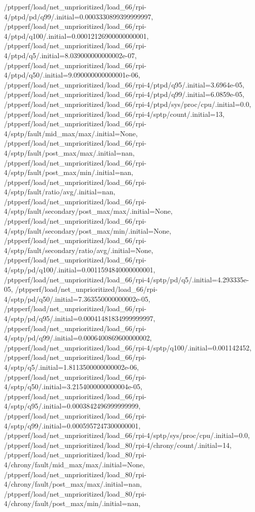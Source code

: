 {    /ptpperf/load/net_unprioritized/load_66/rpi-4/ptpd/pd/q99/.initial=0.0003330899399999997,
    /ptpperf/load/net_unprioritized/load_66/rpi-4/ptpd/q100/.initial=0.00012126900000000001,
    /ptpperf/load/net_unprioritized/load_66/rpi-4/ptpd/q5/.initial=8.039000000000002e-07,
    /ptpperf/load/net_unprioritized/load_66/rpi-4/ptpd/q50/.initial=9.090000000000001e-06,
    /ptpperf/load/net_unprioritized/load_66/rpi-4/ptpd/q95/.initial=3.6964e-05,
    /ptpperf/load/net_unprioritized/load_66/rpi-4/ptpd/q99/.initial=6.0859e-05,
    /ptpperf/load/net_unprioritized/load_66/rpi-4/ptpd/sys/proc/cpu/.initial=0.0,
    /ptpperf/load/net_unprioritized/load_66/rpi-4/sptp/count/.initial=13,
    /ptpperf/load/net_unprioritized/load_66/rpi-4/sptp/fault/mid_max/max/.initial=None,
    /ptpperf/load/net_unprioritized/load_66/rpi-4/sptp/fault/post_max/max/.initial=nan,
    /ptpperf/load/net_unprioritized/load_66/rpi-4/sptp/fault/post_max/min/.initial=nan,
    /ptpperf/load/net_unprioritized/load_66/rpi-4/sptp/fault/ratio/avg/.initial=nan,
    /ptpperf/load/net_unprioritized/load_66/rpi-4/sptp/fault/secondary/post_max/max/.initial=None,
    /ptpperf/load/net_unprioritized/load_66/rpi-4/sptp/fault/secondary/post_max/min/.initial=None,
    /ptpperf/load/net_unprioritized/load_66/rpi-4/sptp/fault/secondary/ratio/avg/.initial=None,
    /ptpperf/load/net_unprioritized/load_66/rpi-4/sptp/pd/q100/.initial=0.0011594840000000001,
    /ptpperf/load/net_unprioritized/load_66/rpi-4/sptp/pd/q5/.initial=4.293335e-05,
    /ptpperf/load/net_unprioritized/load_66/rpi-4/sptp/pd/q50/.initial=7.363550000000002e-05,
    /ptpperf/load/net_unprioritized/load_66/rpi-4/sptp/pd/q95/.initial=0.00041481834999999997,
    /ptpperf/load/net_unprioritized/load_66/rpi-4/sptp/pd/q99/.initial=0.0006400869600000002,
    /ptpperf/load/net_unprioritized/load_66/rpi-4/sptp/q100/.initial=0.001142452,
    /ptpperf/load/net_unprioritized/load_66/rpi-4/sptp/q5/.initial=1.8113500000000002e-06,
    /ptpperf/load/net_unprioritized/load_66/rpi-4/sptp/q50/.initial=3.2154000000000004e-05,
    /ptpperf/load/net_unprioritized/load_66/rpi-4/sptp/q95/.initial=0.0003842496999999999,
    /ptpperf/load/net_unprioritized/load_66/rpi-4/sptp/q99/.initial=0.0005957247300000001,
    /ptpperf/load/net_unprioritized/load_66/rpi-4/sptp/sys/proc/cpu/.initial=0.0,
    /ptpperf/load/net_unprioritized/load_80/rpi-4/chrony/count/.initial=14,
    /ptpperf/load/net_unprioritized/load_80/rpi-4/chrony/fault/mid_max/max/.initial=None,
    /ptpperf/load/net_unprioritized/load_80/rpi-4/chrony/fault/post_max/max/.initial=nan,
    /ptpperf/load/net_unprioritized/load_80/rpi-4/chrony/fault/post_max/min/.initial=nan,
}
